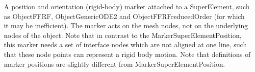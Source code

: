 \ei

%
\newpage


\label{sec:item:MarkerSuperElementRigid}
A position and orientation (rigid-body) marker attached to a SuperElement, such as ObjectFFRF, ObjectGenericODE2 and ObjectFFRFreducedOrder (for which it may be inefficient). The marker acts on the mesh nodes, not on the underlying nodes of the object. Note that in contrast to the MarkerSuperElementPosition, this marker needs a set of interface nodes which are not aligned at one line, such that these node points can represent a rigid body motion. Note that definitions of marker positions are slightly different from MarkerSuperElementPosition.
\vspace{12pt}\\

